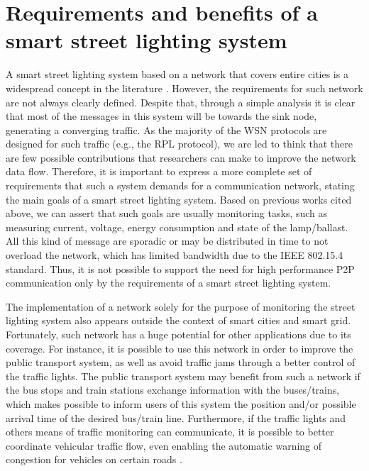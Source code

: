 \documentclass[final,authoryear,3p,twocolumn]{elsarticle}
\begin{document}
\section{Requirements and benefits of a smart street lighting system}
\label{secRequirements}
A smart street lighting system based on a network that covers entire cities is a widespread concept in the literature \citep{Our_IAS_2009, WSN_Street_Lighting_2010_1, Cellular_Street_Lighting_2010_1, Pantoni_2011, daFonseca_2015}. However, the requirements for such network are not always clearly defined. Despite that, through a simple analysis it is clear that most of the messages in this system will be towards the sink node, generating a converging traffic. As the majority of the WSN protocols are designed for such traffic (e.g., the RPL protocol), we are led to think that there are few possible contributions that researchers can make to improve the network data flow. Therefore, it is important to express a more complete set of requirements that such a system demands for a communication network, stating the main goals of a smart street lighting system. Based on previous works cited above, we can assert that such goals are usually monitoring tasks, such as measuring current, voltage, energy consumption and state of the lamp/ballast. All this kind of message are sporadic or may be distributed in time to not overload the network, which has limited bandwidth due to the IEEE 802.15.4 standard. Thus, it is not possible to support the need for high performance P2P communication only by the requirements of a smart street lighting system.

The implementation of a network solely for the purpose of monitoring the street lighting system also appears outside the context of smart cities and smart grid. Fortunately, such network has a huge potential for other applications due to its coverage. For instance, it is possible to use this network in order to improve the public transport system, as well as avoid traffic jams through a better control of the traffic lights. The public transport system may benefit from such a network if the bus stops and train stations exchange information with the buses/trains, which makes possible to inform users of this system the position and/or possible arrival time of the desired bus/train line. Furthermore, if the traffic lights and others means of traffic monitoring can communicate, it is possible to better coordinate vehicular traffic flow, even enabling the automatic warning of congestion for vehicles on certain roads \citep{SmartCity_ITS_2013}.
\end{document}
